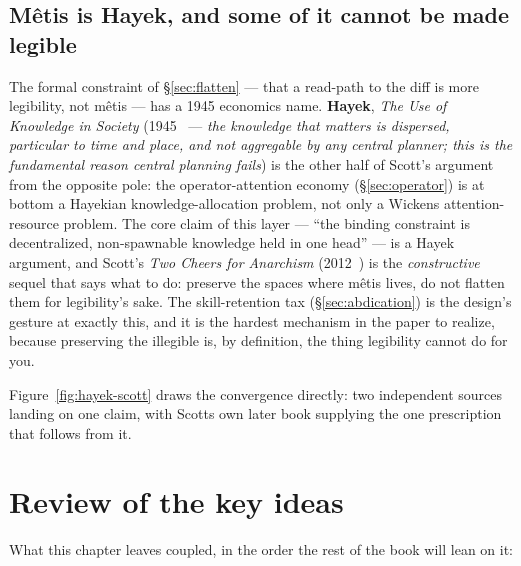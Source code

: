 \documentclass[11pt,a4paper]{article}
\theoremstyle{definition}
\theoremstyle{plain}
\begin{document}
\subsection{M\^etis is Hayek, and some of it cannot be made legible}\label{sec:hayek}

The formal constraint of \S\ref{sec:flatten} --- that a read-path to the diff is more
legibility, not m\^etis --- has a 1945 economics name. \textbf{Hayek}, \emph{The Use
of Knowledge in Society} (1945~ --- \emph{the knowledge that matters
is dispersed, particular to time and place, and not aggregable by any central
planner; this is the fundamental reason central planning fails}) is the other half of
Scott's argument from the opposite pole: the operator-attention economy
(\S\ref{sec:operator}) is at bottom a Hayekian knowledge-allocation problem, not only
a Wickens attention-resource problem. The core claim of this layer --- ``the binding
constraint is decentralized, non-spawnable knowledge held in one head'' --- is a Hayek
argument, and Scott's \emph{Two Cheers for Anarchism} (2012~) is the
\emph{constructive} sequel that says what to do: preserve the spaces where m\^etis
lives, do not flatten them for legibility's sake. The skill-retention tax
(\S\ref{sec:abdication}) is the design's gesture at exactly this, and it is the
hardest mechanism in the paper to realize, because preserving the illegible is, by
definition, the thing legibility cannot do for you.


Figure~\ref{fig:hayek-scott} draws the convergence directly: two
independent sources landing on one claim, with Scotts own later book
supplying the one prescription that follows from it.

\pdexercisepointer{\ref{ex:ls-hobbes-mapping}}{\ref{ex:ls-ranker-political-organ}}{\pageref{ex:ls-hobbes-mapping}}

\section*{Review of the key ideas}

What this chapter leaves coupled, in the order the rest of the book will lean on it:
\end{document}
